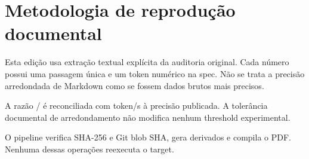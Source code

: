 \section{Metodologia de reprodução documental}
Esta edição usa extração textual explícita da auditoria original. Cada número possui uma passagem única e um token numérico na spec. Não se trata a precisão arredondada de Markdown como se fossem dados brutos mais precisos.

A razão / é reconciliada com  token/s à precisão publicada. A tolerância documental de arredondamento não modifica nenhum threshold experimental. 

O pipeline verifica SHA-256 e Git blob SHA, gera derivados e compila o PDF. Nenhuma dessas operações reexecuta o target. 
